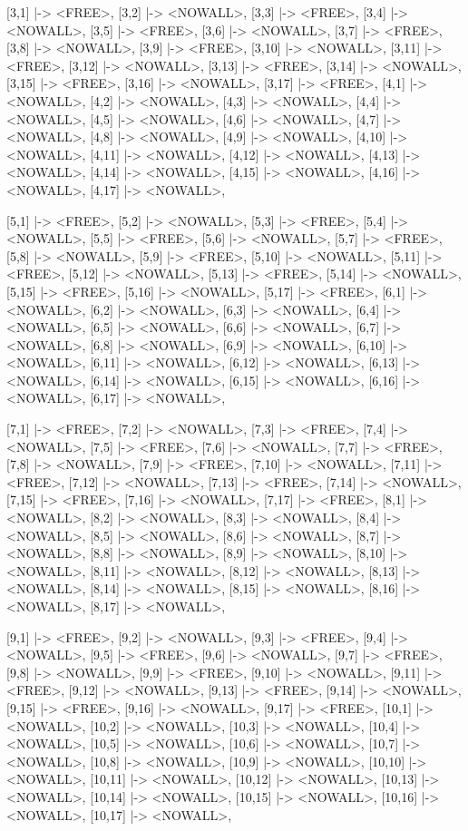 \begin{vdmpp}[breaklines=true]
{     [3,1] |-> <FREE>, [3,2] |-> <NOWALL>, [3,3] |-> <FREE>, [3,4] |-> <NOWALL>, [3,5] |-> <FREE>, [3,6] |-> <NOWALL>, [3,7] |-> <FREE>, [3,8] |-> <NOWALL>, [3,9] |-> <FREE>, [3,10] |-> <NOWALL>, 
     [3,11] |-> <FREE>, [3,12] |-> <NOWALL>, [3,13] |-> <FREE>, [3,14] |-> <NOWALL>, [3,15] |-> <FREE>, [3,16] |-> <NOWALL>, [3,17] |-> <FREE>,
     [4,1] |-> <NOWALL>, [4,2] |-> <NOWALL>, [4,3] |-> <NOWALL>, [4,4] |-> <NOWALL>, [4,5] |-> <NOWALL>, [4,6] |-> <NOWALL>, [4,7] |-> <NOWALL>, [4,8] |-> <NOWALL>, [4,9] |-> <NOWALL>, [4,10] |-> <NOWALL>, 
     [4,11] |-> <NOWALL>, [4,12] |-> <NOWALL>, [4,13] |-> <NOWALL>, [4,14] |-> <NOWALL>, [4,15] |-> <NOWALL>, [4,16] |-> <NOWALL>, [4,17] |-> <NOWALL>,
  
     [5,1] |-> <FREE>, [5,2] |-> <NOWALL>, [5,3] |-> <FREE>, [5,4] |-> <NOWALL>, [5,5] |-> <FREE>, [5,6] |-> <NOWALL>, [5,7] |-> <FREE>, [5,8] |-> <NOWALL>, [5,9] |-> <FREE>, [5,10] |-> <NOWALL>, 
     [5,11] |-> <FREE>, [5,12] |-> <NOWALL>, [5,13] |-> <FREE>, [5,14] |-> <NOWALL>, [5,15] |-> <FREE>, [5,16] |-> <NOWALL>, [5,17] |-> <FREE>,
     [6,1] |-> <NOWALL>, [6,2] |-> <NOWALL>, [6,3] |-> <NOWALL>, [6,4] |-> <NOWALL>, [6,5] |-> <NOWALL>, [6,6] |-> <NOWALL>, [6,7] |-> <NOWALL>, [6,8] |-> <NOWALL>, [6,9] |-> <NOWALL>, [6,10] |-> <NOWALL>, 
     [6,11] |-> <NOWALL>, [6,12] |-> <NOWALL>, [6,13] |-> <NOWALL>, [6,14] |-> <NOWALL>, [6,15] |-> <NOWALL>, [6,16] |-> <NOWALL>, [6,17] |-> <NOWALL>,
     
     [7,1] |-> <FREE>, [7,2] |-> <NOWALL>, [7,3] |-> <FREE>, [7,4] |-> <NOWALL>, [7,5] |-> <FREE>, [7,6] |-> <NOWALL>, [7,7] |-> <FREE>, [7,8] |-> <NOWALL>, [7,9] |-> <FREE>, [7,10] |-> <NOWALL>, 
     [7,11] |-> <FREE>, [7,12] |-> <NOWALL>, [7,13] |-> <FREE>, [7,14] |-> <NOWALL>, [7,15] |-> <FREE>, [7,16] |-> <NOWALL>, [7,17] |-> <FREE>,
     [8,1] |-> <NOWALL>, [8,2] |-> <NOWALL>, [8,3] |-> <NOWALL>, [8,4] |-> <NOWALL>, [8,5] |-> <NOWALL>, [8,6] |-> <NOWALL>, [8,7] |-> <NOWALL>, [8,8] |-> <NOWALL>, [8,9] |-> <NOWALL>, [8,10] |-> <NOWALL>, 
     [8,11] |-> <NOWALL>, [8,12] |-> <NOWALL>, [8,13] |-> <NOWALL>, [8,14] |-> <NOWALL>, [8,15] |-> <NOWALL>, [8,16] |-> <NOWALL>, [8,17] |-> <NOWALL>,
     
     [9,1] |-> <FREE>, [9,2] |-> <NOWALL>, [9,3] |-> <FREE>, [9,4] |-> <NOWALL>, [9,5] |-> <FREE>, [9,6] |-> <NOWALL>, [9,7] |-> <FREE>, [9,8] |-> <NOWALL>, [9,9] |-> <FREE>, [9,10] |-> <NOWALL>, 
     [9,11] |-> <FREE>, [9,12] |-> <NOWALL>, [9,13] |-> <FREE>, [9,14] |-> <NOWALL>, [9,15] |-> <FREE>, [9,16] |-> <NOWALL>, [9,17] |-> <FREE>,
     [10,1] |-> <NOWALL>, [10,2] |-> <NOWALL>, [10,3] |-> <NOWALL>, [10,4] |-> <NOWALL>, [10,5] |-> <NOWALL>, [10,6] |-> <NOWALL>, [10,7] |-> <NOWALL>, [10,8] |-> <NOWALL>, [10,9] |-> <NOWALL>, [10,10] |-> <NOWALL>, 
     [10,11] |-> <NOWALL>, [10,12] |-> <NOWALL>, [10,13] |-> <NOWALL>, [10,14] |-> <NOWALL>, [10,15] |-> <NOWALL>, [10,16] |-> <NOWALL>, [10,17] |-> <NOWALL>,
     
}
\end{vdmpp}
